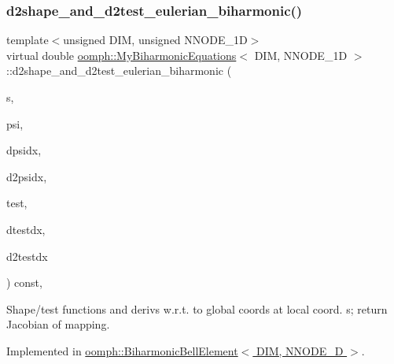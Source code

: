\subsubsection{\texorpdfstring{d2shape\+\_\+and\+\_\+d2test\+\_\+eulerian\+\_\+biharmonic()}{d2shape\_and\_d2test\_eulerian\_biharmonic()}}
{\footnotesize\ttfamily template$<$unsigned D\+IM, unsigned N\+N\+O\+D\+E\+\_\+1D$>$ \\
virtual double \hyperlink{classoomph_1_1MyBiharmonicEquations}{oomph\+::\+My\+Biharmonic\+Equations}$<$ D\+IM, N\+N\+O\+D\+E\+\_\+1D $>$\+::d2shape\+\_\+and\+\_\+d2test\+\_\+eulerian\+\_\+biharmonic (\begin{DoxyParamCaption}\item[{const Vector$<$ double $>$ \&}]{s,  }\item[{Shape \&}]{psi,  }\item[{D\+Shape \&}]{dpsidx,  }\item[{D\+Shape \&}]{d2psidx,  }\item[{Shape \&}]{test,  }\item[{D\+Shape \&}]{dtestdx,  }\item[{D\+Shape \&}]{d2testdx }\end{DoxyParamCaption}) const\hspace{0.3cm}{\ttfamily [protected]}, {}}



Shape/test functions and derivs w.\+r.\+t. to global coords at local coord. s; return Jacobian of mapping. 



Implemented in \hyperlink{classoomph_1_1BiharmonicBellElement_ac0343916d2900e138d5d5e98aa46b758}{oomph\+::\+Biharmonic\+Bell\+Element$<$ D\+I\+M, N\+N\+O\+D\+E\+\_\+D $>$}.

\mbox{\label{classoomph_1_1MyBiharmonicEquations_a08e45fddb2c25119e6ba826cd6cafdbf}} 
